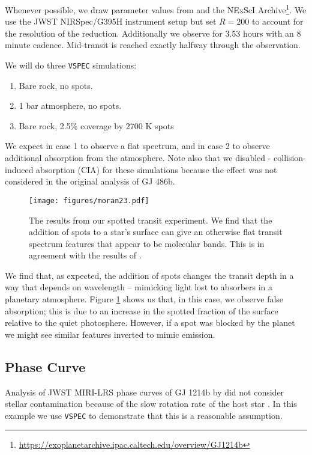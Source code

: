 \documentclass[twocolumn]{aastex631}
\newcommand{\vspec}[1]{\texttt{VSPEC}#1}
\begin{document}
Whenever possible, we draw parameter values from \citet{moran2023} and the NExScI Archive\footnote{\url{https://exoplanetarchive.ipac.caltech.edu/overview/GJ1214b}}.
We use the JWST NIRSpec/G395H instrument setup but set $R=200$ to account for the resolution of the reduction.
Additionally we observe for 3.53 hours with an 8 minute cadence. Mid-transit is reached exactly halfway through the observation.

We will do three \vspec{} simulations:
\begin{enumerate}
    \item Bare rock, no spots.
    \item 1 bar  atmosphere, no spots.
    \item Bare rock, 2.5\% coverage by 2700 K spots
\end{enumerate}

We expect in case 1 to observe a flat spectrum, and in case 2 to observe additional
absorption from the  atmosphere. Note also that we disabled - collision-induced absorption (CIA) for
these simulations because the effect was not considered in the original analysis of GJ 486b.

\begin{figure}
    \centering
    \texttt{[image: figures/moran23.pdf]}
    \caption{
        The results from our spotted transit experiment. We find that the addition of
        spots to a star's surface can give an otherwise flat transit spectrum features that appear to be molecular bands.
        This is in agreement with the results of \citet{moran2023}.
        }
    \label{fig:moran_transit}
\end{figure}

We find that, as expected, the addition of spots changes the transit depth in a way that depends on wavelength -- mimicking
light lost to absorbers in a planetary atmosphere. Figure \ref{fig:moran_transit} shows us that, in this case, we observe false absorption;
this is due to an increase in the spotted fraction of the surface relative to the quiet photosphere. However, if a spot was blocked by
the planet we might see similar features inverted to mimic emission.

\subsection{Phase Curve}
Analysis of JWST MIRI-LRS phase curves of GJ 1214b by \citet{kempton2023} did not consider stellar
contamination because of the slow rotation rate of the host star \citep[approximately 1/80$^{\text{th}}$ the orbital frequency,][]{cloutier2021}.
In this example we use \vspec{} to demonstrate that this is a reasonable assumption.
\end{document}
